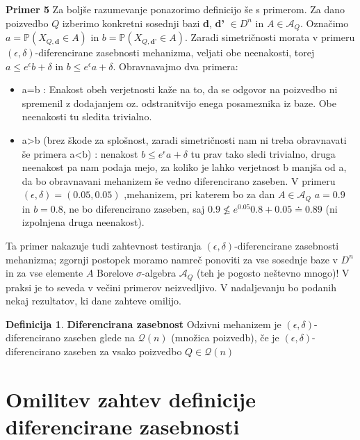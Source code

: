 \documentclass[mat1]{article}
\theoremstyle{definition}
\newtheorem{definition}{Definicija}
\begin{document}
\textbf{Primer 5} Za boljše razumevanje ponazorimo definicijo še s primerom. Za dano poizvedbo $Q$ izberimo konkretni sosednji bazi \textbf{d}, \textbf{d'} $\in D^n$ in $A\in \mathcal{A}_{Q}$. Označimo $a = \mathbb{P}(X_{Q,\textbf{d}}\in A)$ in $b = \mathbb{P}(X_{Q,\textbf{d'}}\in A)$. Zaradi simetričnosti morata v primeru $(\epsilon, \delta)$-diferencirane zasebnosti mehanizma, veljati obe neenakosti, torej $a \leq e^{\epsilon}b+\delta$ in $b \leq e^{\epsilon}a+\delta$. Obravnavajmo dva primera:
\begin{itemize}
\item a=b : Enakost obeh verjetnosti kaže na to, da se odgovor na poizvedbo ni spremenil z dodajanjem oz. odstranitvijo enega posameznika iz baze. Obe neenakosti tu sledita trivialno.
\item a>b (brez škode za splošnost, zaradi simetričnosti nam ni treba obravnavati še primera a<b) : nenakost $b \leq e^{\epsilon}a+\delta$ tu prav tako sledi trivialno, druga neenakost pa nam podaja mejo, za koliko je lahko verjetnost b manjša od a, da bo obravnavani mehanizem še vedno diferencirano zaseben. V primeru $(\epsilon, \delta) = (0.05, 0.05)$ ,mehanizem, pri katerem bo za dan $A \in \mathcal{A}_{Q}$ $a=0.9$ in $b=0.8$, ne bo diferencirano zaseben, saj $0.9 \nleq e^{0.05} 0.8 + 0.05 \doteq 0.89$ (ni izpolnjena druga neenakost).
\end{itemize}
Ta primer nakazuje tudi zahtevnost testiranja $(\epsilon, \delta)$-diferencirane zasebnosti mehanizma; zgornji postopek moramo namreč ponoviti za vse sosednje baze v $D^n$ in za vse elemente $A$ Borelove $\sigma$-algebra $\mathcal{A}_Q$ (teh je pogosto neštevno mnogo)! V praksi je to seveda v večini primerov neizvedljivo. V nadaljevanju bo podanih nekaj rezultatov, ki dane zahteve omilijo.


\begin{definition} {\textbf{Diferencirana zasebnost}}
Odzivni mehanizem je $(\epsilon, \delta)$-diferencirano zaseben glede na $\mathcal{Q}(n)$ (množica poizvedb), če je $(\epsilon, \delta)$-diferencirano zaseben za vsako poizvedbo $Q \in \mathcal{Q}(n)$
\end{definition}

\section{Omilitev zahtev definicije diferencirane zasebnosti}
\end{document}
